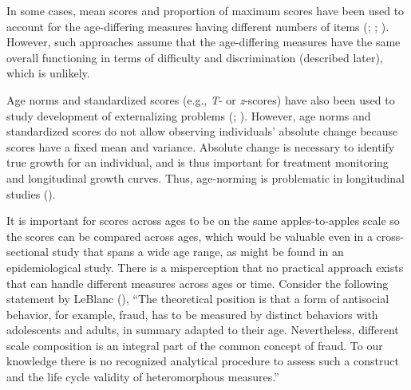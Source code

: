 \documentclass[
  american,
  letterpaper,
  12pt]{article}
\begin{document}
In some cases, mean scores and proportion of maximum scores have been
used to account for the age-differing measures having different numbers
of items (;
;
). However, such
approaches assume that the age-differing measures have the same overall
functioning in terms of difficulty and discrimination (described later),
which is unlikely.

Age norms and standardized scores (e.g., \emph{T}- or \emph{z}-scores)
have also been used to study development of externalizing problems
(;
). However, age norms
and standardized scores do not allow observing individuals' absolute
change because scores have a fixed mean and variance. Absolute change is
necessary to identify true growth for an individual, and is thus
important for treatment monitoring and longitudinal growth curves. Thus,
age-norming is problematic in longitudinal studies
().

It is important for scores across ages to be on the same
apples-to-apples scale so the scores can be compared across ages, which
would be valuable even in a cross-sectional study that spans a wide age
range, as might be found in an epidemiological study. There is a
misperception that no practical approach exists that can handle
different measures across ages or time. Consider the following statement
by LeBlanc (), ``The theoretical
position is that a form of antisocial behavior, for example, fraud, has
to be measured by distinct behaviors with adolescents and adults, in
summary adapted to their age. Nevertheless, different scale composition
is an integral part of the common concept of fraud. To our knowledge
there is no recognized analytical procedure to assess such a construct
and the life cycle validity of heteromorphous measures.''
\end{document}
